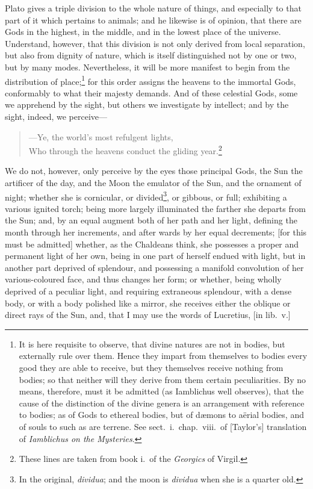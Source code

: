 \documentclass{article}
\begin{document}
Plato gives a triple division to the whole nature of things, and especially to
that part of it which pertains to animals; and he likewise is of opinion, that
there are Gods in the highest, in the middle, and in the lowest place of the
universe. Understand, however, that this division is not only derived from
local separation, but also from dignity of nature, which is itself
distinguished not by one or two, but by many modes. Nevertheless, it will be
more manifest to begin from the distribution of place;\footnote{It is here
requisite to observe, that divine natures are not in bodies, but externally
rule over them. Hence they impart from themselves to bodies every good they are
able to receive, but they themselves receive nothing from bodies; so that
neither will they derive from them certain peculiarities. By no means,
therefore, must it be admitted (as Iamblichus well observes), that the cause of
the distinction of the divine genera is an arrangement with reference to
bodies; as of Gods to ethereal bodies, but of d{\ae}mons to a\"{e}rial bodies,
and of souls to such as are terrene. See sect.~i.~chap.~viii.~of [Taylor's]
translation of \textit{Iamblichus on the Mysteries}.} for this order assigns
the heavens to the immortal Gods, conformably to what their majesty demands.
And of these celestial Gods, some we apprehend by the sight, but others we
investigate by intellect; and by the sight, indeed, we perceive---

\begin{verse}
---Ye, the world's most refulgent lights,\\
Who through the heavens conduct the gliding year.\footnote{These lines are
taken from book i.~of the \textit{Georgics} of Virgil.}
\end{verse}

\noindent We do not, however, only perceive by the eyes those principal Gods,
the Sun the artificer of the day, and the Moon the emulator of the Sun, and the
ornament of night; whether she is cornicular, or divided\footnote{In the
original, \textit{dividua}; and the moon is \textit{dividua} when she is a
quarter old.}, or gibbous, or full; exhibiting a various ignited torch; being
more largely illuminated the farther she departs from the Sun; and, by an equal
augment both of her path and her light, defining the month through her
increments, and after wards by her equal decrements; [for this must be
admitted] whether, as the Chaldeans think, she possesses a proper and permanent
light of her own, being in one part of herself endued with light, but in
another part deprived of splendour, and possessing a manifold convolution of
her various-coloured face, and thus changes her form; or whether, being wholly
deprived of a peculiar light, and requiring extraneous splendour, with a dense
body, or with a body polished like a mirror, she receives either the oblique or
direct rays of the Sun, and, that I may use the words of Lucretius, [in
lib.~v.]
\end{document}
